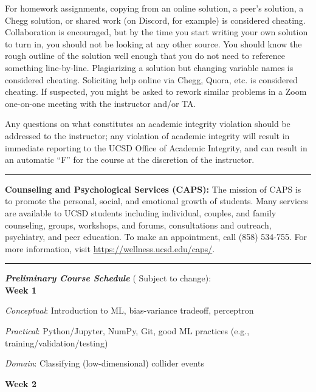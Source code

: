 \documentclass[12pt]{article}
\begin{document}
For homework assignments, copying from an online solution, a peer's solution, a Chegg solution, or shared work (on Discord, for example) is considered cheating.
Collaboration is encouraged, but by the time you start writing your own solution to turn in, you should not be looking at any other source.
You should know the rough outline of the solution well enough that you do not need to reference something line-by-line.
Plagiarizing a solution but changing variable names is considered cheating.
Soliciting help online via Chegg, Quora, etc. is considered cheating.
If suspected, you might be asked to rework similar problems in a Zoom one-on-one meeting with the instructor and/or TA.

Any questions on what constitutes an academic integrity violation should be addressed to the instructor; any violation of academic integrity will result in immediate reporting to the UCSD Office of Academic Integrity, and can result in an automatic ``F'' for the course at the discretion of the instructor.

\begin{center}
	\rule{\textwidth}{0.5pt}
\end{center}

\noindent\textbf{Counseling and Psychological Services (CAPS):} The mission of CAPS is to promote the personal, social, and emotional growth of students.
Many services are available to UCSD students including individual, couples, and family counseling, groups, workshops, and forums, consultations and outreach, psychiatry, and peer education.
To make an appointment, call (858) 534-755.
For more information, visit \href{https://wellness.ucsd.edu/caps/}{https://wellness.ucsd.edu/caps/}.

\begin{center}
	\rule{\textwidth}{0.5pt}
\end{center}

\noindent\textbf{\emph{Preliminary Course Schedule}} ({\color{Orange} Subject to change}):\\

\textbf{Week 1}

\emph{Conceptual}: Introduction to ML, bias-variance tradeoff, perceptron

\emph{Practical}: Python/Jupyter, NumPy, Git, good ML practices (e.g., training/validation/testing)

\emph{Domain}: Classifying (low-dimensional) collider events

\textbf{Week 2}
\end{document}

